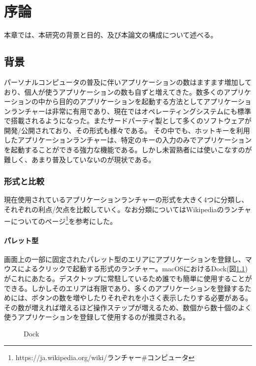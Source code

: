 \chapter{序論}
\label{chap:introduction}

本章では、本研究の背景と目的、及び本論文の構成について述べる。

\newpage

\section{背景}
パーソナルコンピュータの普及に伴いアプリケーションの数はますます増加しており、個人が使うアプリケーションの数も自ずと増えてきた。数多くのアプリケーションの中から目的のアプリケーションを起動する方法としてアプリケーションランチャーは非常に有用であり、現在ではオペレーティングシステムにも標準で搭載されるようになった。またサードパーティ製として多くのソフトウェアが開発/公開されており、その形式も様々である。
その中でも、ホットキーを利用したアプリケーションランチャーは、特定のキーの入力のみでアプリケーションを起動することができる強力な機能である。しかし未習熟者には使いこなすのが難しく、あまり普及していないのが現状である。

\subsection{形式と比較}
現在使用されているアプリケーションランチャーの形式を大きく4つに分類し、それぞれの利点/欠点を比較していく。なお分類についてはWikipediaのランチャーについてのページ\footnote{https://ja.wikipedia.org/wiki/ランチャー\#コンピュータ}を参考にした。

\subsubsection{パレット型}

画面上の一部に固定されたパレット型のエリアにアプリケーションを登録し、マウスによるクリックで起動する形式のランチャー。macOSにおけるDock(図\ref{fig:dock})がこれにあたる。デスクトップに常駐しているため誰でも簡単に使用することができる。しかしそのエリアは有限であり、多くのアプリケーションを登録するためには、ボタンの数を増やしたりそれぞれを小さく表示したりする必要がある。その数が増えれば増えるほど操作ステップが増えるため、数個から数十個のよく使うアプリケーションを登録して使用するのが推奨される。

\begin{figure}[h]
    \begin{center}
    \end{center}
    \caption{Dock}
    \label{fig:dock}
\end{figure}

